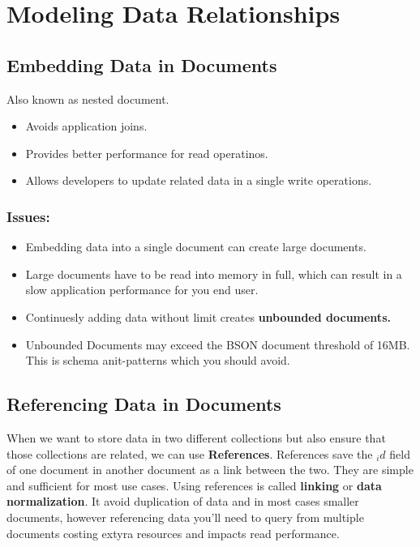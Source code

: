 \documentclass[../main.tex]{subfiles}
\begin{document}
\section{Modeling Data Relationships}
\subsection{Embedding Data in Documents}
Also known as nested document.
\begin{itemize}
	\item Avoids application joins. 
	\item Provides better performance for read operatinos.
	\item Allows developers to update related data in a single write operations.
\end{itemize}
\subsubsection {Issues:}

\begin{itemize}
	\item Embedding data into a single document can create large documents.
	\item{Large documents have to be read into memory in full, which can result in a slow application performance for you end user.}
	\item{Continuesly adding data without limit creates \textbf{unbounded documents.}}
	\item{Unbounded Documents may exceed the \gls{BSON} document threshold of 16MB. This is schema anit-patterns which you should avoid.}
\end{itemize}

\subsection{Referencing Data in Documents}
When we want to store data in two different collections but also ensure that those collections are related, we can use \textbf{References}.
References save the $_id$ field of one document in another document as a link between the two.
They are simple and sufficient for most use cases. Using references is called \textbf{linking} or \textbf{data normalization}.
It avoid duplication of data and in most cases smaller documents, however referencing data you'll need to query from multiple documents costing extyra resources and impacts read performance. 

\bigskip
\end{document}
